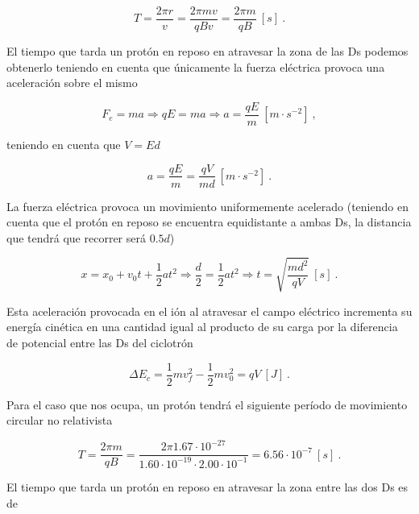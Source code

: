 \documentclass[journal]{IEEEtran}
\begin{document}
\begin{equation}
T = \displaystyle\frac{2\pi r}{v} = \displaystyle\frac{2\pi mv}{qBv} = \displaystyle\frac{2\pi m}{qB}~[s]~.
\end{equation}

El tiempo que tarda un protón en reposo en atravesar la zona de las Ds podemos obtenerlo teniendo en cuenta que únicamente la fuerza eléctrica provoca una aceleración sobre el mismo

\begin{equation}
F_e = ma \Rightarrow qE = ma \Rightarrow a = \displaystyle\frac{qE}{m}~[m\cdot s^{-2}]~,
\end{equation}

teniendo en cuenta que $V = Ed$

\begin{equation}
a = \displaystyle\frac{qE}{m} = \displaystyle\frac{qV}{md}~[m\cdot s^{-2}]~.
\end{equation}

La fuerza eléctrica provoca un movimiento uniformemente acelerado (teniendo en cuenta que el protón en reposo se encuentra equidistante a ambas Ds, la distancia que tendrá que recorrer será $0.5d$)

\begin{equation}
x = x_0 + v_0t + \displaystyle\frac{1}{2}at^2 \Rightarrow \displaystyle\frac{d}{2} = \displaystyle\frac{1}{2}at^2 \Rightarrow t = \sqrt{\displaystyle\frac{md^2}{qV}}~[s]~.
\end{equation}

Esta aceleración provocada en el ión al atravesar el campo eléctrico incrementa su energía cinética en una cantidad igual al producto de su carga por la diferencia de potencial entre las Ds del ciclotrón

\begin{equation}
\Delta E_c = \displaystyle\frac{1}{2}mv_f^2 - \displaystyle\frac{1}{2}mv_0^2 = qV~[J]~.
\end{equation}

Para el caso que nos ocupa, un protón tendrá el siguiente período de movimiento circular no relativista

\begin{equation}
T = \displaystyle\frac{2\pi m}{qB} = \displaystyle\frac{2\pi 1.67\cdot10^{-27}}{1.60\cdot 10^{-19}\cdot 2.00\cdot 10^{-1}} = 6.56\cdot 10^{-7}~[s]~.
\end{equation}

El tiempo que tarda un protón en reposo en atravesar la zona entre las dos Ds es de
\end{document}
